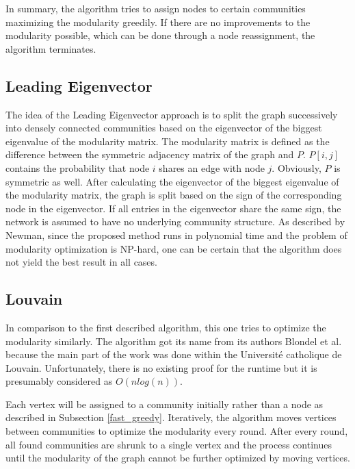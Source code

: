 \documentclass[sigconf]{acmart}
\begin{document}
In summary, the algorithm tries to assign nodes to certain communities maximizing the modularity greedily. If there are no improvements to the modularity possible, which can be done through a node reassignment, the algorithm terminates.



\subsection{Leading Eigenvector}

The idea of the Leading Eigenvector\cite{newman2006finding} approach is to split the graph successively into densely connected communities based on the eigenvector of the biggest eigenvalue of the modularity matrix.
The modularity matrix is defined as the difference between the symmetric adjacency matrix of the graph and $P$.
$P[i, j]$ contains the probability that node $i$ shares an edge with node $j$.
Obviously, $P$ is symmetric as well.
After calculating the eigenvector of the biggest eigenvalue of the modularity matrix, the graph is split based on the sign of the corresponding node in the eigenvector.
If all entries in the eigenvector share the same sign, the network is assumed to have no underlying community structure.
As described by Newman\cite{newman2006finding}, since the proposed method runs in polynomial time and the problem of modularity optimization is NP-hard, one can be certain that the algorithm does not yield the best result in all cases.


\subsection{Louvain}

In comparison to the first described algorithm, this one tries to optimize the modularity similarly.
The algorithm got its name from its authors Blondel et al. \cite{blondel2008fast} because the main part of the work was done within the Universit\'e catholique de Louvain.
Unfortunately, there is no existing proof for the runtime but it is presumably considered as $O(nlog(n))$.

Each vertex will be assigned to a community initially rather than a node as described in Subsection \ref{fast_greedy}.
Iteratively, the algorithm moves vertices between communities to optimize the modularity every round.
After every round, all found communities are shrunk to a single vertex and the process continues until the modularity of the graph cannot be further optimized by moving vertices. 
\end{document}
